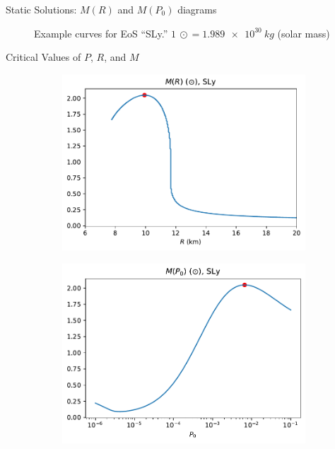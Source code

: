 \documentclass[]{beamer}
\begin{document}
\begin{frame}{Static Solutions: $M(R)$ and $M(P_0)$ diagrams}
\begin{figure}[h!]
\begin{subfigure}{.5\textwidth}
            \end{subfigure}
            \caption[]{Example curves for EoS ``SLy.'' $\SI{1}{\odot} = \SI{1.989e+30}{kg}$ (solar mass)}
        \end{figure}
    \end{frame}

    \begin{frame}{Critical Values of $P$, $R$, and $M$}
        \vspace{-10pt}
        \begin{figure}[h!]
            \centering
            \begin{subfigure}{.5\textwidth}
                \includegraphics[width = \textwidth]{../paper/images/tov/r_analysis,SLy.pdf}
            \end{subfigure}%
            \begin{subfigure}{.5\textwidth}
                \includegraphics[width = \textwidth]{../paper/images/tov/p0_analysis,SLy.pdf}

\end{subfigure}
\end{figure}
\end{frame}
\end{document}

